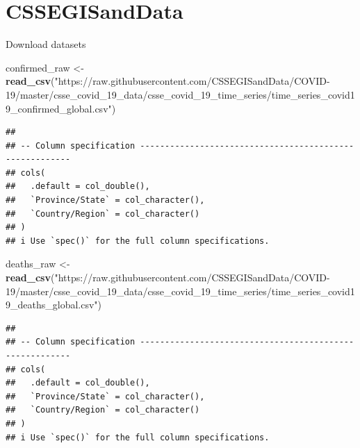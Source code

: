 \documentclass[]{article}
\newenvironment{Shaded}{\begin{snugshade}}{\end{snugshade}}
\newcommand{\KeywordTok}[1]{\textcolor[rgb]{0.13,0.29,0.53}{\textbf{#1}}}
\newcommand{\NormalTok}[1]{#1}
\newcommand{\OperatorTok}[1]{\textcolor[rgb]{0.81,0.36,0.00}{\textbf{#1}}}
\newcommand{\StringTok}[1]{\textcolor[rgb]{0.31,0.60,0.02}{#1}}
\begin{document}
\hypertarget{cssegisanddata}{%
\section{CSSEGISandData}\label{cssegisanddata}}

Download datasets

\begin{Shaded}
\begin{Highlighting}[]
\NormalTok{confirmed_raw <-}\StringTok{ }\KeywordTok{read_csv}\NormalTok{(}\StringTok{"https://raw.githubusercontent.com/CSSEGISandData/COVID-19/master/csse_covid_19_data/csse_covid_19_time_series/time_series_covid19_confirmed_global.csv"}\NormalTok{)}
\end{Highlighting}
\end{Shaded}

\begin{verbatim}
## 
## -- Column specification --------------------------------------------------------
## cols(
##   .default = col_double(),
##   `Province/State` = col_character(),
##   `Country/Region` = col_character()
## )
## i Use `spec()` for the full column specifications.
\end{verbatim}

\begin{Shaded}
\begin{Highlighting}[]
\NormalTok{deaths_raw <-}\StringTok{ }\KeywordTok{read_csv}\NormalTok{(}\StringTok{"https://raw.githubusercontent.com/CSSEGISandData/COVID-19/master/csse_covid_19_data/csse_covid_19_time_series/time_series_covid19_deaths_global.csv"}\NormalTok{)}
\end{Highlighting}
\end{Shaded}

\begin{verbatim}
## 
## -- Column specification --------------------------------------------------------
## cols(
##   .default = col_double(),
##   `Province/State` = col_character(),
##   `Country/Region` = col_character()
## )
## i Use `spec()` for the full column specifications.
\end{verbatim}

\begin{Shaded}
\end{Shaded}
\end{document}
